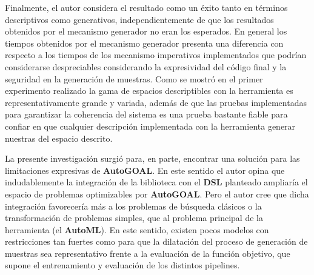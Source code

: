 Finalmente, el autor considera el resultado como un éxito tanto en términos descriptivos como generativos, independientemente
de que los resultados obtenidos por el mecanismo generador no eran los esperados. En general los tiempos obtenidos por el
mecanismo generador presenta una diferencia con respecto a los tiempos de los mecanismo imperativos implementados que podrían
considerarse despreciables considerando la expresividad del código final y la seguridad en la generación de muestras. Como se
mostró en el primer experimento realizado la gama de espacios descriptibles con la herramienta es representativamente grande y
variada, además de que las pruebas implementadas para garantizar la coherencia del sistema es una prueba bastante fiable para
confiar en que cualquier descripción implementada con la herramienta generar nuestras del espacio descrito.

La presente investigación surgió para, en parte, encontrar una solución para las limitaciones expresivas de {\bf AutoGOAL}. En este
sentido el autor opina que indudablemente la integración de la biblioteca con el {\bf DSL} planteado ampliaría el espacio de problemas
optimizables por {\bf AutoGOAL}. Pero el autor cree que dicha integración favorecería más a los problemas de búsqueda clásicos o la
transformación de problemas simples, que al problema principal de la herramienta (el {\bf AutoML}). En este sentido, existen pocos modelos
con restricciones tan fuertes como para que la dilatación del proceso de generación de muestras sea representativo frente a la
evaluación de la función objetivo, que supone el entrenamiento y evaluación de los distintos pipelines.